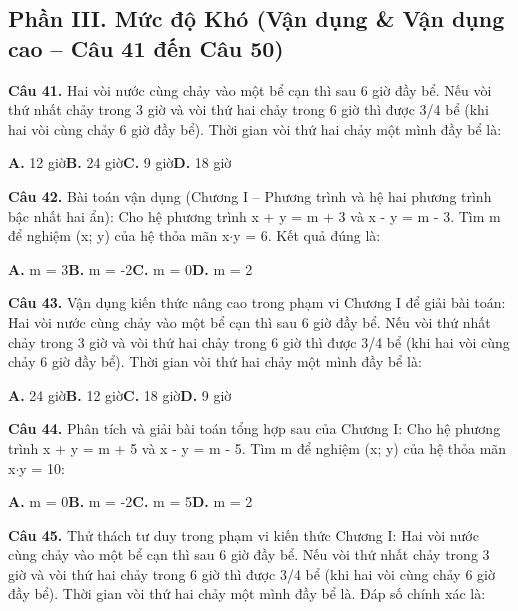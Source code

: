 \documentclass[11pt,a4paper]{article}
\begin{document}
\subsection*{\color{accent} Phần III. Mức độ Khó (Vận dụng \& Vận dụng cao -- Câu 41 đến Câu 50)}
\textbf{\color{primary} Câu 41.} Hai vòi nước cùng chảy vào một bể cạn thì sau 6 giờ đầy bể. Nếu vòi thứ nhất chảy trong 3 giờ và vòi thứ hai chảy trong 6 giờ thì được 3/4 bể (khi hai vòi cùng chảy 6 giờ đầy bể). Thời gian vòi thứ hai chảy một mình đầy bể là:\par
\hspace*{1.5em}\textbf{A.} 12 giờ\quad\quad \textbf{B.} 24 giờ\quad\quad \textbf{C.} 9 giờ\quad\quad \textbf{D.} 18 giờ\par\vspace{2pt}
\textbf{\color{primary} Câu 42.} Bài toán vận dụng (Chương I – Phương trình và hệ hai phương trình bậc nhất hai ẩn): Cho hệ phương trình x + y = m + 3 và x - y = m - 3. Tìm m để nghiệm (x; y) của hệ thỏa mãn x$\cdot$y = 6. Kết quả đúng là:\par
\hspace*{1.5em}\textbf{A.} m = 3\quad\quad \textbf{B.} m = -2\quad\quad \textbf{C.} m = 0\quad\quad \textbf{D.} m = 2\par\vspace{2pt}
\textbf{\color{primary} Câu 43.} Vận dụng kiến thức nâng cao trong phạm vi Chương I để giải bài toán: Hai vòi nước cùng chảy vào một bể cạn thì sau 6 giờ đầy bể. Nếu vòi thứ nhất chảy trong 3 giờ và vòi thứ hai chảy trong 6 giờ thì được 3/4 bể (khi hai vòi cùng chảy 6 giờ đầy bể). Thời gian vòi thứ hai chảy một mình đầy bể là:\par
\hspace*{1.5em}\textbf{A.} 24 giờ\quad\quad \textbf{B.} 12 giờ\quad\quad \textbf{C.} 18 giờ\quad\quad \textbf{D.} 9 giờ\par\vspace{2pt}
\textbf{\color{primary} Câu 44.} Phân tích và giải bài toán tổng hợp sau của Chương I: Cho hệ phương trình x + y = m + 5 và x - y = m - 5. Tìm m để nghiệm (x; y) của hệ thỏa mãn x$\cdot$y = 10:\par
\hspace*{1.5em}\textbf{A.} m = 0\quad\quad \textbf{B.} m = -2\quad\quad \textbf{C.} m = 5\quad\quad \textbf{D.} m = 2\par\vspace{2pt}
\textbf{\color{primary} Câu 45.} Thử thách tư duy trong phạm vi kiến thức Chương I: Hai vòi nước cùng chảy vào một bể cạn thì sau 6 giờ đầy bể. Nếu vòi thứ nhất chảy trong 3 giờ và vòi thứ hai chảy trong 6 giờ thì được 3/4 bể (khi hai vòi cùng chảy 6 giờ đầy bể). Thời gian vòi thứ hai chảy một mình đầy bể là. Đáp số chính xác là:\par
\end{document}
